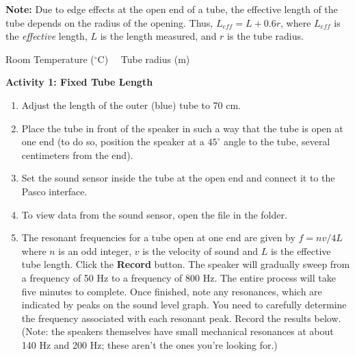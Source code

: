 \textbf{Note:} Due to edge effects at the open end of a tube, the effective length of the tube depends on the radius of the opening. Thus, $L_{eff} = L + 0.6r$, where $L_{eff}$ is the \textit{effective} length, $L$ is the length measured, and $r$ is the tube radius.

\medskip
Room Temperature ($^\circ$C) \hrulefill \ \  Tube radius (m) \hrulefill

\bigskip

\textbf{Activity 1: Fixed Tube Length} 
\begin{enumerate}[labparts]



\item Adjust the length of the outer (blue) tube to 70 cm.

\item Place the tube in front of the speaker in such a way that the tube is open at one end (to do so, position the speaker at a $45^\circ$ angle to the tube, several centimeters from the end).

\item Set the sound sensor inside the tube at the open end and connect it to the Pasco interface.

\item To view data from the sound sensor, open the file  in the \filename{\coursefolder} folder.  


\item The resonant frequencies for a tube open at one end are given by $f=nv/4L$ where $n$ is an odd integer, $v$ is the velocity of sound and $L$ is the effective tube length. Click the \textbf{Record} button. The speaker will gradually sweep from a frequency of 50 Hz to a frequency of 800 Hz. The entire process will take five minutes to complete. Once finished, note any resonances, which are indicated by peaks on the sound level graph. You need to carefully determine the frequency associated with each resonant peak.  Record the results below. (Note: the speakers themselves have small mechanical resonances at about 140 Hz and 200 Hz; these aren't the ones you're looking for.)
\vspace{10mm}


\end{enumerate}
